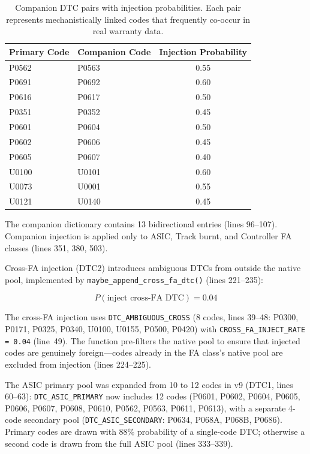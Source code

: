 \documentclass[10pt,a4paper]{article}
\begin{document}
\begin{table}[H]
\centering
\caption{Companion DTC pairs with injection probabilities. Each pair represents mechanistically linked codes that frequently co-occur in real warranty data.}
\label{tab:companion-pairs}
\begin{tabular}{llc}
\toprule
\textbf{Primary Code} & \textbf{Companion Code} & \textbf{Injection Probability} \\
\midrule
P0562 & P0563 & 0.55 \\
P0691 & P0692 & 0.60 \\
P0616 & P0617 & 0.50 \\
P0351 & P0352 & 0.45 \\
P0601 & P0604 & 0.50 \\
P0602 & P0606 & 0.45 \\
P0605 & P0607 & 0.40 \\
U0100 & U0101 & 0.60 \\
U0073 & U0001 & 0.55 \\
U0121 & U0140 & 0.45 \\
\bottomrule
\end{tabular}
\end{table}

The companion dictionary contains 13 bidirectional entries (lines 96--107). Companion injection is applied only to ASIC, Track burnt, and Controller FA classes (lines 351, 380, 503).

Cross-FA injection (DTC2) introduces ambiguous DTCs from outside the native pool, implemented by \texttt{maybe\_append\_cross\_fa\_dtc()} (lines 221--235):

\begin{equation}
P(\text{inject cross-FA DTC}) = 0.04
\label{eq:cross-fa-dtc}
\end{equation}

The cross-FA injection uses \texttt{DTC\_AMBIGUOUS\_CROSS}
(8 codes, lines 39--48: P0300, P0171, P0325, P0340, U0100, U0155,
P0500, P0420) with \texttt{CROSS\_FA\_INJECT\_RATE = 0.04} (line~49).
The function pre-filters the native pool to ensure that injected codes
are genuinely foreign---codes already in the FA class's native pool are
excluded from injection (lines 224--225).

The ASIC primary pool was expanded from 10 to 12 codes in v9
(DTC1, lines 60--63): \texttt{DTC\_ASIC\_PRIMARY} now includes 12 codes
(P0601, P0602, P0604, P0605, P0606, P0607, P0608, P0610, P0562, P0563,
P0611, P0613), with a separate 4-code secondary pool
(\texttt{DTC\_ASIC\_SECONDARY}: P0634, P068A, P068B, P0686).
Primary codes are drawn with 88\% probability of a single-code DTC;
otherwise a second code is drawn from the full ASIC pool
(lines 333--339).
\end{document}
